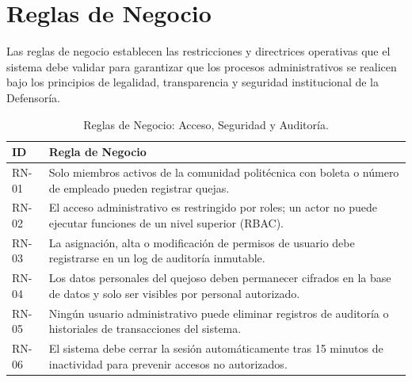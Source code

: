 \section{Reglas de Negocio}

Las reglas de negocio establecen las restricciones y directrices operativas que el sistema debe validar para garantizar que los procesos administrativos se realicen bajo los principios de legalidad, transparencia y seguridad institucional de la Defensoría.

\begin{table}[h!]
\centering
\scriptsize
\caption{Reglas de Negocio: Acceso, Seguridad y Auditoría.}
\label{tab:rn_seguridad}
\begin{tabular}{@{} l p{12cm} @{}}
\toprule
\rowcolor[HTML]{2D3E50} 
\textbf{\color[HTML]{FFFFFF} ID} & \textbf{\color[HTML]{FFFFFF} Regla de Negocio} \\ \midrule
RN-01 & Solo miembros activos de la comunidad politécnica con boleta o número de empleado pueden registrar quejas. \\
\rowcolor[HTML]{F2F4F7} 
RN-02 & El acceso administrativo es restringido por roles; un actor no puede ejecutar funciones de un nivel superior (RBAC). \\
RN-03 & La asignación, alta o modificación de permisos de usuario debe registrarse en un log de auditoría inmutable. \\
\rowcolor[HTML]{F2F4F7} 
RN-04 & Los datos personales del quejoso deben permanecer cifrados en la base de datos y solo ser visibles por personal autorizado. \\
RN-05 & Ningún usuario administrativo puede eliminar registros de auditoría o historiales de transacciones del sistema. \\
\rowcolor[HTML]{F2F4F7} 
RN-06 & El sistema debe cerrar la sesión automáticamente tras 15 minutos de inactividad para prevenir accesos no autorizados. \\ \bottomrule
\end{tabular}
\end{table}


